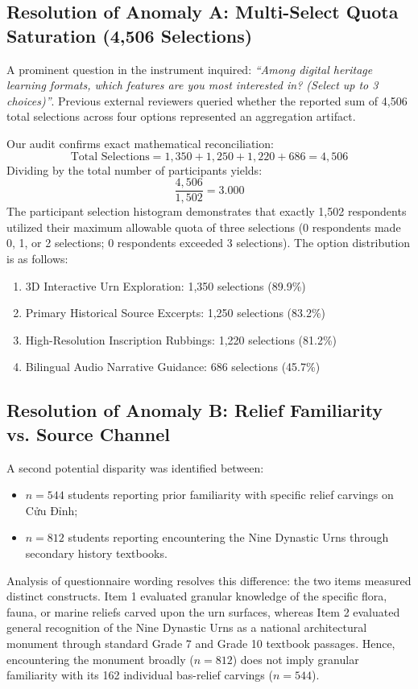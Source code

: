 \documentclass[journal]{IEEEtran}
\begin{document}
\subsection{Resolution of Anomaly A: Multi-Select Quota Saturation (4,506 Selections)}
A prominent question in the instrument inquired: \textit{``Among digital heritage learning formats, which features are you most interested in? (Select up to 3 choices)''}. Previous external reviewers queried whether the reported sum of 4,506 total selections across four options represented an aggregation artifact.

Our audit confirms exact mathematical reconciliation:
\begin{equation}
\text{Total Selections} = 1,350 + 1,250 + 1,220 + 686 = 4,506
\end{equation}
Dividing by the total number of participants yields:
\begin{equation}
\frac{4,506}{1,502} = 3.000
\end{equation}
The participant selection histogram demonstrates that exactly 1,502 respondents utilized their maximum allowable quota of three selections (0 respondents made 0, 1, or 2 selections; 0 respondents exceeded 3 selections). The option distribution is as follows:
\begin{enumerate}
    \item 3D Interactive Urn Exploration: 1,350 selections (89.9\%)
    \item Primary Historical Source Excerpts: 1,250 selections (83.2\%)
    \item High-Resolution Inscription Rubbings: 1,220 selections (81.2\%)
    \item Bilingual Audio Narrative Guidance: 686 selections (45.7\%)
\end{enumerate}

\subsection{Resolution of Anomaly B: Relief Familiarity vs. Source Channel}
A second potential disparity was identified between:
\begin{itemize}
    \item $n = 544$ students reporting prior familiarity with specific relief carvings on Cửu Đỉnh;
    \item $n = 812$ students reporting encountering the Nine Dynastic Urns through secondary history textbooks.
\end{itemize}
Analysis of questionnaire wording resolves this difference: the two items measured distinct constructs. Item 1 evaluated granular knowledge of the specific flora, fauna, or marine reliefs carved upon the urn surfaces, whereas Item 2 evaluated general recognition of the Nine Dynastic Urns as a national architectural monument through standard Grade 7 and Grade 10 textbook passages. Hence, encountering the monument broadly ($n=812$) does not imply granular familiarity with its 162 individual bas-relief carvings ($n=544$).
\end{document}
